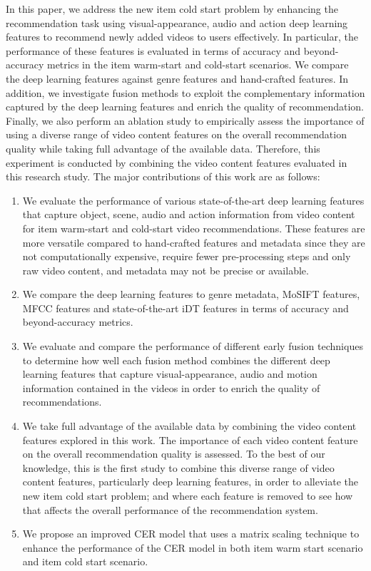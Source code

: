 \documentclass[review]{elsarticle}
\begin{document}
In this paper, we address the new item cold start problem by enhancing the recommendation task using visual-appearance, audio and action deep learning features to recommend newly added videos to users effectively. In particular, the performance of these features is evaluated in terms of accuracy and beyond-accuracy metrics in the item warm-start and cold-start scenarios. We compare the deep learning features against genre features and hand-crafted features. In addition, we investigate fusion methods to exploit the complementary information captured by the deep learning features and enrich the quality of recommendation. Finally, we also perform an ablation study to empirically assess the importance of using a diverse range of video content features on the overall recommendation quality while taking full advantage of the available data. Therefore, this experiment is conducted by combining the video content features evaluated in this research study. The major contributions of this work are as follows:

\begin{enumerate}
    \item  We evaluate the performance of various state-of-the-art deep learning features that capture object, scene, audio and action information from video content for item warm-start and cold-start video recommendations. These features are more versatile compared to hand-crafted features and metadata since they are not computationally expensive, require fewer pre-processing steps and only raw video content, and metadata may not be precise or available.   
    
    \item We compare the deep learning features to genre metadata, \ac{MoSIFT} features, \ac{MFCC} features and state-of-the-art \ac{iDT} features in terms of accuracy and beyond-accuracy metrics. 

    \item We evaluate and compare the performance of different early fusion techniques to determine how well each fusion method combines the different deep learning features that capture visual-appearance, audio and motion information contained in the videos in order to enrich the quality of recommendations.
    
    \item We take full advantage of the available data by combining the video content features explored in this work. The importance of each video content feature on the overall recommendation quality is assessed. To the best of our knowledge, this is the first study to combine this diverse range of video content features, particularly deep learning features, in order to alleviate the new item cold start problem; and where each feature is removed to see how that affects the overall performance of the recommendation system. 
    
    \item We propose an improved \ac{CER} model that uses a matrix scaling technique to enhance the performance of the \ac{CER} model in both item warm start scenario and item cold start scenario.  
\end{enumerate}
\end{document}
